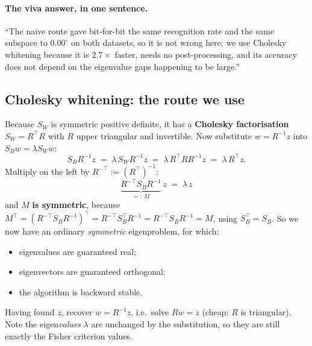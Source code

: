 \documentclass[11pt]{article}
\theoremstyle{definition}
\theoremstyle{remark}
\newcommand{\Sw}{S_W}
\newcommand{\Sb}{S_B}
\begin{document}
\paragraph{The viva answer, in one sentence.} ``The naive route gave bit-for-bit
the same recognition rate and the same subspace to $0.00^\circ$ on both
datasets, so it is not wrong here; we use Cholesky whitening because it is
$2.7\times$ faster, needs no post-processing, and its accuracy does not depend
on the eigenvalue gaps happening to be large.''

\subsection{Cholesky whitening: the route we use}

Because $\Sw$ is symmetric positive definite, it has a \textbf{Cholesky
factorisation} $\Sw=R^{\!\top} R$ with $R$ upper triangular and invertible. Now
substitute $w=R^{-1}z$ into $\Sb w=\lambda\Sw w$:
\[
  \Sb R^{-1}z \;=\; \lambda\, \Sw R^{-1} z \;=\; \lambda\, R^{\!\top} R R^{-1} z \;=\; \lambda\, R^{\!\top} z .
\]
Multiply on the left by $R^{-\top} := (R^{\!\top})^{-1}$:
\[
  \boxed{\;\underbrace{R^{-\top}\Sb R^{-1}}_{=:\,M}\,z \;=\; \lambda\, z\;}
\]
and $M$ \textbf{is symmetric}, because
$M^{\!\top} = (R^{-\top}\Sb R^{-1})^{\!\top} = R^{-\top}\Sb^{\!\top} R^{-1} = R^{-\top}\Sb R^{-1} = M$,
using $\Sb^{\!\top}=\Sb$. So we now have an ordinary \emph{symmetric} eigenproblem,
for which:
\begin{itemize}[nosep]
\item eigenvalues are guaranteed real;
\item eigenvectors are guaranteed orthogonal;
\item the algorithm is backward stable.
\end{itemize}
Having found $z$, recover $w = R^{-1}z$, i.e.\ solve $Rw=z$ (cheap: $R$ is
triangular). Note the eigen\emph{values} $\lambda$ are unchanged by the
substitution, so they are still exactly the Fisher criterion values.
\end{document}
